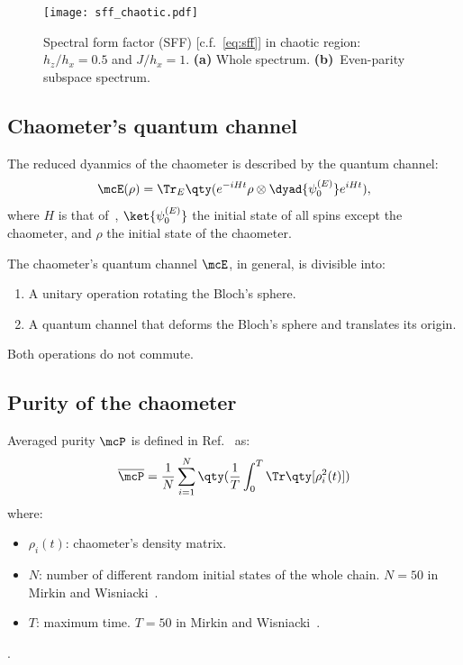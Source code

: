 \begin{figure}
\centering
\texttt{[image: sff\_chaotic.pdf]}
\caption{Spectral form factor (SFF) [c.f.~\eqref{eq:sff}] in chaotic region: $h_z/h_x=0.5$ and 
$J/h_x=1$. \textbf{(a)} Whole spectrum. \textbf{(b)}~Even-parity subspace 
spectrum.}
\label{fig:sff:chaotic}
\end{figure}

\subsection{Chaometer's quantum channel}
The reduced dyanmics of the chaometer is described by the quantum channel: 
\begin{equation}\label{eq:chaometer:channel}
\mcE(\rho) = 
\Tr_E \qty(
e^{-i H t}
\rho \otimes \dyad{\psi_0^{(E)}}
e^{i H t}
),
\end{equation}
where $H$ is that of~, $\ket{\psi_0^{(E)}}$
the initial state of all spins except the chaometer, and $\rho$ the initial 
state of the chaometer. 

The chaometer's quantum channel $\mcE$, in general, is divisible into: 
\begin{enumerate}
\item A unitary operation rotating the Bloch's sphere.
\item A quantum channel that deforms the Bloch's sphere and translates its origin.
\end{enumerate}
Both operations do not commute. 

\subsection{Purity of the chaometer}%
Averaged purity $\mcP$ is defined in Ref.~\cite{mirkin2021quantum} as:
\begin{equation}\label{eq:avg:purity}
\overline \mcP =
\frac{1}{N}
\sum_{i=1}^{N}
\qty(
\frac{1}{T}
\int_0^T
\Tr \qty[
\rho_i^2(t)
]
)
\end{equation}
where: 
\begin{itemize}
\item $\rho_i(t)$: chaometer's density matrix.
\item $N$: number of different random initial states of the whole chain. 
$N=50$ in Mirkin and Wisniacki~\cite{mirkin2021quantum}.
\item $T$: maximum time. $T=50$ in Mirkin and Wisniacki~\cite{mirkin2021quantum}.
\end{itemize}.

